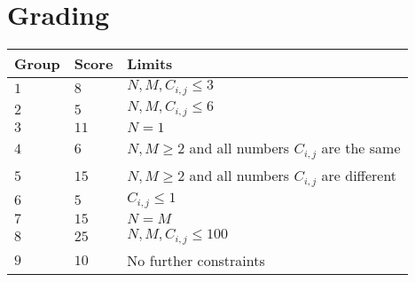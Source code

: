 \section*{Grading}
\begin{tabular}{| l | l | p{12cm} |}
    \hline
    Group & Score & Limits \\ \hline
    $1$   & $8$       & $N,M,C_{i,j} \leq 3$\\ \hline
    $2$   & $5$       & $N,M,C_{i,j} \leq 6$  \\ \hline
    $3$   & $11$       & $N = 1$ \\ \hline
    $4$   & $6$       & $N,M \geq 2$ and all numbers $C_{i,j}$ are the same \\ \hline
    $5$   & $15$       & $N,M \geq 2$ and all numbers $C_{i,j}$ are different \\ \hline
    $6$   & $5$       & $C_{i,j} \leq 1$ \\ \hline
    $7$   & $15$       & $N = M$ \\ \hline
    $8$   & $25$       & $N,M,C_{i,j} \leq 100$ \\ \hline
    $9$   & $10$       & No further constraints \\ \hline
  \end{tabular}
